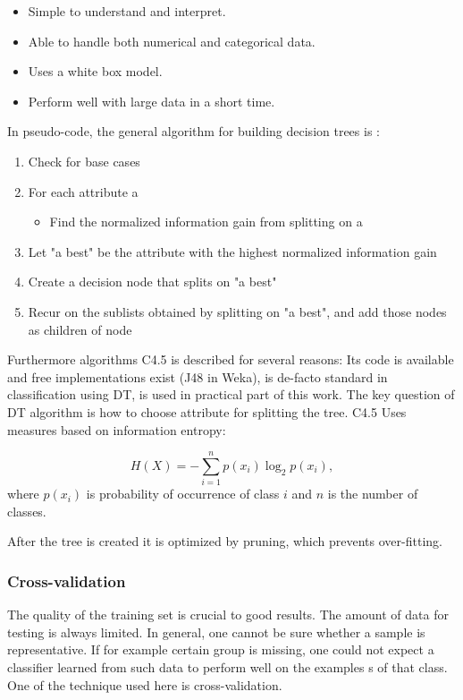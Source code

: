 \begin{itemize}
\item Simple to understand and interpret.
\item Able to handle both numerical and categorical data.
\item Uses a white box model.
\item Perform well with large data in a short time.
\end{itemize}

In pseudo-code, the general algorithm for building decision trees is
\citep{kotsiantis2007supervised}:
\begin{enumerate}
\item Check for base cases
\item For each attribute a
  \begin{itemize}
  \item Find the normalized information gain from splitting on a
  \end{itemize}
\item Let "a best" be the attribute with the highest normalized information gain
\item Create a decision node that splits on "a best"
\item Recur on the sublists obtained by splitting on "a best", and add
  those nodes as children of node
\end{enumerate}

Furthermore algorithms C4.5 is described for several reasons: Its code
is available and free implementations exist (J48 in Weka), is de-facto
standard in classification using DT, is used in practical part of this
work. The key question of DT algorithm is how to choose attribute for
splitting the tree. C4.5 Uses measures based on information entropy:

\begin{equation}
  \label{eq:entropy}
  H(X) = -\sum_{i=1}^n {p(x_i) \log_2 p(x_i)},
\end{equation}
where $p(x_i)$ is probability of occurrence of class $i$ and $n$ is the
number of classes.

After the tree is created it is optimized by pruning, which prevents
over-fitting.

\subsubsection{Cross-validation}
The quality of the training set is crucial to good results. The amount
of data for testing is always limited. In general, one cannot be sure
whether a sample is representative. If for example certain group is
missing, one could not expect a classifier learned from such data to
perform well on the examples s of that class. One of the technique used
here is cross-validation.

